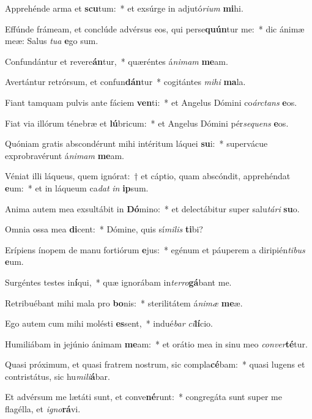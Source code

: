 \item Apprehénde arma et \textbf{scu}tum:~* et exsúrge in adjutó\textit{ri}\textit{um} \textbf{mi}hi.
\item Effúnde frámeam, et conclúde advérsus eos, qui perse\textbf{quún}tur me:~* dic ánimæ meæ: Salus \textit{tu}\textit{a} \textbf{e}go sum.
\item Confundántur et revere\textbf{án}tur,~* quæréntes á\textit{ni}\textit{mam} \textbf{me}am.
\item Avertántur retrórsum, et confun\textbf{dán}tur~* cogitántes \textit{mi}\textit{hi} \textbf{ma}la.
\item Fiant tamquam pulvis ante fáciem \textbf{ven}ti:~* et Angelus Dómini co\textit{árc}\textit{tans} \textbf{e}os.
\item Fiat via illórum ténebræ et \textbf{lú}bricum:~* et Angelus Dómini pér\textit{se}\textit{quens} \textbf{e}os.
\item Quóniam gratis abscondérunt mihi intéritum láquei \textbf{su}i:~* supervácue exprobravérunt á\textit{ni}\textit{mam} \textbf{me}am.
\item Véniat illi láqueus, quem ignórat:~† et cáptio, quam abscóndit, apprehéndat \textbf{e}um:~* et in láqueum ca\textit{dat} \textit{in} \textbf{ip}sum.
\item Anima autem mea exsultábit in \textbf{Dó}mino:~* et delectábitur super salu\textit{tá}\textit{ri} \textbf{su}o.
\item Omnia ossa mea \textbf{di}cent:~* Dómine, quis sí\textit{mi}\textit{lis} \textbf{ti}bi?
\item Erípiens ínopem de manu fortiórum \textbf{e}jus:~* egénum et páuperem a diripién\textit{ti}\textit{bus} \textbf{e}um.
\item Surgéntes testes in\textbf{í}qui,~* quæ ignorábam in\textit{ter}\textit{ro}\textbf{gá}bant me.
\item Retribuébant mihi mala pro \textbf{bo}nis:~* sterilitátem á\textit{ni}\textit{mæ} \textbf{me}æ.
\item Ego autem cum mihi molésti \textbf{es}sent,~* indué\textit{bar} \textit{ci}\textbf{lí}cio.
\item Humiliábam in jejúnio ánimam \textbf{me}am:~* et orátio mea in sinu meo \textit{con}\textit{ver}\textbf{té}tur.
\item Quasi próximum, et quasi fratrem nostrum, sic compla\textbf{cé}bam:~* quasi lugens et contristátus, sic hu\textit{mi}\textit{li}\textbf{á}bar.
\item Et advérsum me lætáti sunt, et conve\textbf{né}runt:~* congregáta sunt super me flagélla, et \textit{i}\textit{gno}\textbf{rá}vi.
